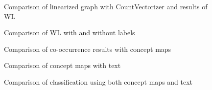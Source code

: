 \begin{figure}[ht]
\centering
\missingfigure[figcolor=white]{}
\caption{Comparison of linearized graph with CountVectorizer and results of WL}
\end{figure}

\begin{figure}[ht]
\centering
\missingfigure[figcolor=white]{}
\caption{Comparison of WL with and without labels}
\end{figure}

\begin{figure}[ht]
\centering
\missingfigure[figcolor=white]{}
\caption{Comparison of co-occurrence results with concept maps}
\end{figure}

\begin{figure}[ht]
\centering
\missingfigure[figcolor=white]{}
\caption{Comparison of concept maps with text}
\end{figure}

\begin{figure}[ht]
\centering
\missingfigure[figcolor=white]{}
\caption{Comparison of classification using both concept maps and text}
\end{figure}



